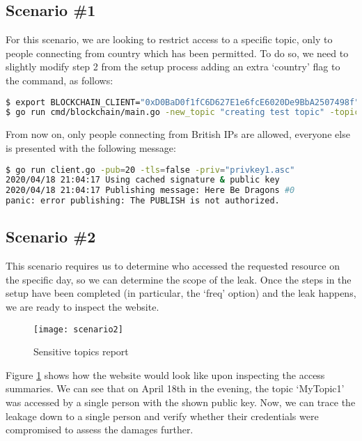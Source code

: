 \subsection{Scenario \#1}
For this scenario, we are looking to restrict access to a specific topic, only to people connecting from country which has been permitted. To do so, we need to slightly modify step 2 from the setup process adding an extra `country' flag to the command, as follows:
\begin{lstlisting}[language=bash,breaklines=true]
$ export BLOCKCHAIN_CLIENT="0xD0BaD0f1fC6D627E1e6fcE6020De9BbA2507498f"
$ go run cmd/blockchain/main.go -new_topic "creating test topic" -topic "RestrictedTopic" -country="GB"
\end{lstlisting}
From now on, only people connecting from British IPs are allowed, everyone else is presented with the following message:
\begin{lstlisting}[language=bash,breaklines=true]
$ go run client.go -pub=20 -tls=false -priv="privkey1.asc"
2020/04/18 21:04:17 Using cached signature & public key
2020/04/18 21:04:17 Publishing message: Here Be Dragons #0
panic: error publishing: The PUBLISH is not authorized.
\end{lstlisting}
\subsection{Scenario \#2}
This scenario requires us to determine who accessed the requested resource on the specific day, so we can determine the scope of the leak. Once the steps in the setup have been completed (in particular, the `freq' option) and the leak happens, we are ready to inspect the website.

\begin{figure}[h]
    \centering
    \texttt{[image: scenario2]}
    \caption{Sensitive topics report}
    \label{fig:scenario2}
\end{figure}
Figure \ref{fig:scenario2} shows how the website would look like upon inspecting the access summaries. We can see that on April 18th in the evening, the topic `MyTopic1' was accessed by a single person with the shown public key. Now, we can trace the leakage down to a single person and verify whether their credentials were compromised to assess the damages further.
